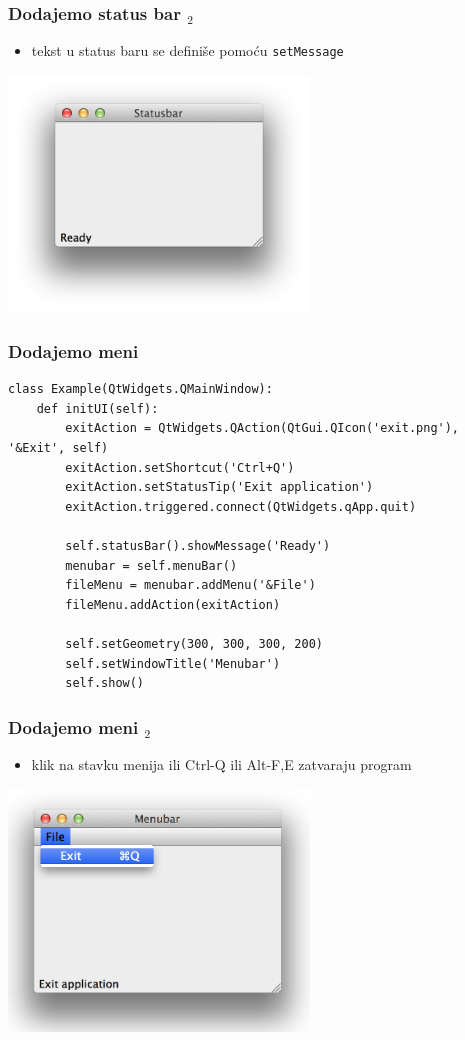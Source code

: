 \documentclass[utf8,compress,aspectratio=169]{beamer}
\begin{document}
\begin{frame}[fragile]
  \frametitle{Dodajemo status bar $_2$}
  \begin{itemize}
    \item tekst u status baru se definiše pomoću \texttt{setMessage}
  \end{itemize}
  \begin{center}
    \includegraphics[width=8cm]{pyqt02.png}
  \end{center}
\end{frame}


\begin{frame}[fragile]
  \frametitle{Dodajemo meni}
\begin{verbatim}
class Example(QtWidgets.QMainWindow):
    def initUI(self):
        exitAction = QtWidgets.QAction(QtGui.QIcon('exit.png'), '&Exit', self)
        exitAction.setShortcut('Ctrl+Q')
        exitAction.setStatusTip('Exit application')
        exitAction.triggered.connect(QtWidgets.qApp.quit)

        self.statusBar().showMessage('Ready')
        menubar = self.menuBar()
        fileMenu = menubar.addMenu('&File')
        fileMenu.addAction(exitAction)

        self.setGeometry(300, 300, 300, 200)
        self.setWindowTitle('Menubar')
        self.show()
\end{verbatim}
\end{frame}

\begin{frame}[fragile]
  \frametitle{Dodajemo meni $_2$}
  \begin{itemize}
    \item klik na stavku menija ili Ctrl-Q ili Alt-F,E zatvaraju program
  \end{itemize}
  \begin{center}
    \includegraphics[width=8cm]{pyqt03.png}
  \end{center}
\end{frame}
\end{document}
